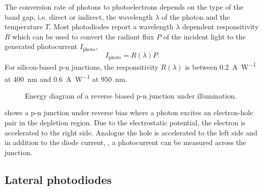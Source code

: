 The conversion rate of photons to photoelectrons depends on the type of the band gap, i.e. direct or indirect, the wavelength $\lambda$ of the photon and the temperature $T$.
Most photodiodes report a wavelength $\lambda$ dependent responsitivity $R$ which can be used to convert the radiant flux $P$ of the incident light to the generated photocurrent $I_\text{photo}$,
\begin{equation}
	I_\text{photo}=R(\lambda)P
	\label{eq:responsitivity}.
\end{equation}
For silicon-based p-n junctions, the responsitivity $R(\lambda)$ is between \SI{0.2}{\ampere\per\watt} at \SI{400}{\nano\meter} and \SI{0.6}{\ampere\per\watt} at \SI{950}{\nano\meter}.

\begin{figure}[H]
	\centering
	
	\caption{Energy diagram of a reverse biased p-n junction under illumination.}\label{fig:pn_junction_illumination}
\end{figure}
 shows a p-n junction under reverse bias where a photon excites an electron-hole pair in the depletion region.
Due to the electrostatic potential, the electron is accelerated to the right side.
Analogue the hole is accelerated to the left side and in addition to the diode current, , a photocurrent can be measured across the junction.

\subsection{Lateral photodiodes}

